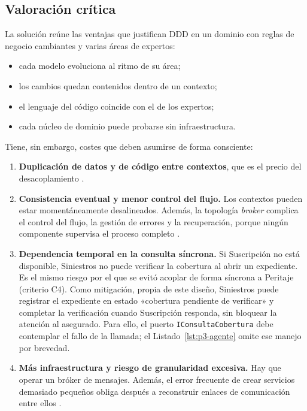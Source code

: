 \subsection*{Valoración crítica}
\label{sec:p3-valoracion}

La solución reúne las ventajas que justifican DDD en un dominio con reglas de negocio
cambiantes y varias áreas de expertos:
\begin{itemize}
  \item cada modelo evoluciona al ritmo de su área;
  \item los cambios quedan contenidos dentro de un contexto;
  \item el lenguaje del código coincide con el de los expertos;
  \item cada núcleo de dominio puede probarse sin infraestructura.
\end{itemize}

Tiene, sin embargo, costes que deben asumirse de forma consciente:
\begin{enumerate}[label=(\arabic*)]
  \item \textbf{Duplicación de datos y de código entre contextos}, que es el precio del
        desacoplamiento \parencite[cap.~17]{richardsford2020}.
  \item \textbf{Consistencia eventual y menor control del flujo.} Los contextos pueden
        estar momentáneamente desalineados. Además, la topología \textit{broker} complica
        el control del flujo, la gestión de errores y la recuperación, porque ningún
        componente supervisa el proceso completo \parencite[cap.~14]{richardsford2020}.
  \item \textbf{Dependencia temporal en la consulta síncrona.} Si Suscripción no está
        disponible, Siniestros no puede verificar la cobertura al abrir un expediente. Es
        el mismo riesgo por el que se evitó acoplar de forma síncrona a Peritaje
        (criterio C4). Como mitigación, propia de este diseño, Siniestros puede registrar
        el expediente en estado «cobertura pendiente de verificar» y completar la
        verificación cuando Suscripción responda, sin bloquear la atención al asegurado. Para
        ello, el puerto \texttt{IConsultaCobertura} debe contemplar el fallo de la
        llamada; el Listado~\ref{lst:p3-agente} omite ese manejo por brevedad.
  \item \textbf{Más infraestructura y riesgo de granularidad excesiva.} Hay que operar un
        bróker de mensajes. Además, el error frecuente de crear servicios demasiado
        pequeños obliga después a reconstruir enlaces de comunicación entre ellos
        \parencite[cap.~17]{richardsford2020}.
\end{enumerate}

